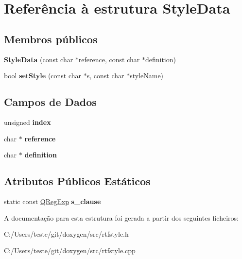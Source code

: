 \hypertarget{struct_style_data}{\section{Referência à estrutura Style\-Data}
\label{struct_style_data}
}
\subsection*{Membros públicos}
\begin{DoxyCompactItemize}
\item 
\hypertarget{struct_style_data_afda6808343f769cb84a5fd2bb827d682}{{\bfseries Style\-Data} (const char $\ast$reference, const char $\ast$definition)}\label{struct_style_data_afda6808343f769cb84a5fd2bb827d682}

\item 
\hypertarget{struct_style_data_aab73740e883086876012ed507da0030c}{bool {\bfseries set\-Style} (const char $\ast$s, const char $\ast$style\-Name)}\label{struct_style_data_aab73740e883086876012ed507da0030c}

\end{DoxyCompactItemize}
\subsection*{Campos de Dados}
\begin{DoxyCompactItemize}
\item 
\hypertarget{struct_style_data_a360ebf6209d16512186ca7adb893abbb}{unsigned {\bfseries index}}\label{struct_style_data_a360ebf6209d16512186ca7adb893abbb}

\item 
\hypertarget{struct_style_data_adc58011fd6a3257ebe4b8db24d22533a}{char $\ast$ {\bfseries reference}}\label{struct_style_data_adc58011fd6a3257ebe4b8db24d22533a}

\item 
\hypertarget{struct_style_data_aa8e50003aaeb385cdbd7a2cf14d061c2}{char $\ast$ {\bfseries definition}}\label{struct_style_data_aa8e50003aaeb385cdbd7a2cf14d061c2}

\end{DoxyCompactItemize}
\subsection*{Atributos Públicos Estáticos}
\begin{DoxyCompactItemize}
\item 
\hypertarget{struct_style_data_a08a604ef04640607fbbe6f006a495d4a}{static const \hyperlink{class_q_reg_exp}{Q\-Reg\-Exp} {\bfseries s\-\_\-clause}}\label{struct_style_data_a08a604ef04640607fbbe6f006a495d4a}

\end{DoxyCompactItemize}


A documentação para esta estrutura foi gerada a partir dos seguintes ficheiros\-:\begin{DoxyCompactItemize}
\item 
C\-:/\-Users/teste/git/doxygen/src/rtfstyle.\-h\item 
C\-:/\-Users/teste/git/doxygen/src/rtfstyle.\-cpp\end{DoxyCompactItemize}
